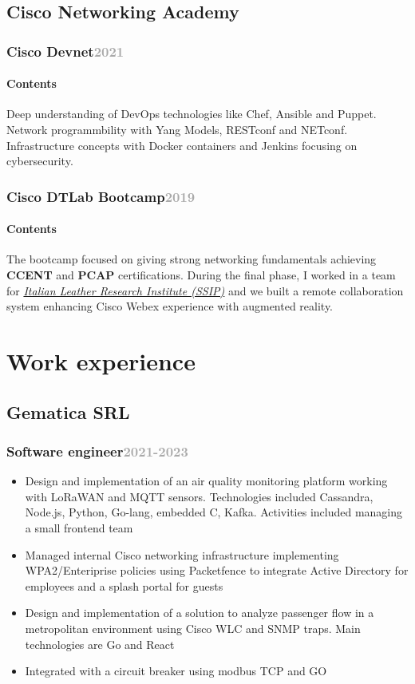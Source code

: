 \documentclass[11pt,a4paper]{article}
\begin{document}
  \subsection{Cisco Networking Academy}
  \subsubsection{Cisco Devnet\hfill \textcolor{darkgray}{\small{2021}}} 
  \paragraph{Contents}Deep understanding of DevOps technologies like Chef, Ansible and Puppet. Network programmbility with Yang Models, RESTconf and NETconf. Infrastructure concepts with Docker containers and Jenkins focusing on cybersecurity.
  \subsubsection{Cisco DTLab Bootcamp\hfill \textcolor{darkgray}{\small{2019}}} 
  \paragraph{Contents} The bootcamp focused on giving strong networking fundamentals achieving \textbf{CCENT} and \textbf{PCAP} certifications. During the final phase, I worked in a team for \href{https://ssip.it/}{\textit{Italian Leather Research Institute (SSIP)}} and we built a remote collaboration system enhancing Cisco Webex experience with augmented reality.

  \section*{Work experience}
  \subsection{Gematica SRL}
  \subsubsection{Software engineer\hfill \textcolor{darkgray}{\small{2021-2023}}}
  \begin{itemize}
    \item Design and implementation of an air quality monitoring platform working with LoRaWAN and MQTT sensors. Technologies included Cassandra, Node.js, Python, Go-lang, embedded C, Kafka. Activities included managing a small frontend team
    \item Managed internal Cisco networking infrastructure implementing WPA2/Enteriprise policies using Packetfence to integrate Active Directory for employees and a splash portal for guests
    \item Design and implementation of a solution to analyze passenger flow in a metropolitan environment using Cisco WLC and SNMP traps. Main technologies are Go and React
    \item Integrated with a circuit breaker using modbus TCP and GO
  \end{itemize}
\end{document}
